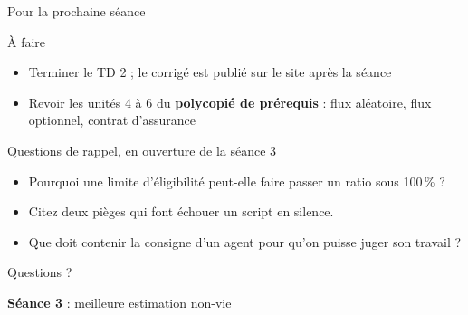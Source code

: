 \documentclass[10pt,aspectratio=169]{beamer}
\begin{document}
\begin{frame}{Pour la prochaine séance}
\begin{block}{À faire}
\begin{itemize}
  \item Terminer le TD 2 ; le corrigé est publié sur le site après la séance
  \item Revoir les unités 4 à 6 du \textbf{polycopié de prérequis} : flux aléatoire, flux optionnel, contrat d'assurance
\end{itemize}
\end{block}
\begin{block}{Questions de rappel, en ouverture de la séance 3}
\begin{itemize}
  \item Pourquoi une limite d'éligibilité peut-elle faire passer un ratio sous 100\,\% ?
  \item Citez deux pièges qui font échouer un script en silence.
  \item Que doit contenir la consigne d'un agent pour qu'on puisse juger son travail ?
\end{itemize}
\end{block}
\end{frame}

\begin{frame}[c]
\centering
\Huge Questions ?

\vspace{1cm}
\Large
\textbf{Séance 3} : meilleure estimation non-vie
\end{frame}
\end{document}
